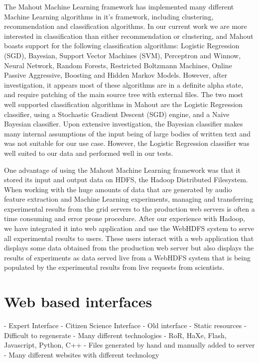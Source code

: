\documentclass[12pt,oneside]{book}
\begin{document}
The Mahout Machine Learning framework has implemented many different
Machine Learning algorithms in it's framework, including clustering,
recommendation and classification algorithms.  In our current work we
are more interested in classification than either recommendation or
clustering, and Mahout boasts support for the following classification
algorithms: Logistic Regression (SGD), Bayesian, Support Vector
Machines (SVM), Perceptron and Winnow, Neural Network, Random Forests,
Restricted Boltzmann Machines, Online Passive Aggressive, Boosting and
Hidden Markov Models.  However, after investigation, it appears most
of these algorithms are in a definite alpha state, and require
patching of the main source tree with external files.  The two most
well supported classification algorithms in Mahout are the Logistic
Regression classifier, using a Stochastic Gradient Descent (SGD)
engine, and a Naive Bayesian classifier.  Upon extensive
investigation, the Bayesian classifier makes many internal assumptions
of the input being of large bodies of written text and was not
suitable for our use case.  However, the Logistic Regression
classifier was well suited to our data and performed well in our
tests.

One advantage of using the Mahout Machine Learning framework was that
it stored its input and output data on HDFS, the Hadoop Distributed
Filesystem.  When working with the huge amounts of data that are
generated by audio feature extraction and Machine Learning
experiments, managing and transferring experimental results from the
grid servers to the production web servers is often a time consuming
and error prone procedure.  After our experience with Hadoop, we have
integrated it into web application and use the WebHDFS system to serve
all experimental results to users.  These users interact with a web
application that displays some data obtained from the production web
server but also displays the results of experiments as data served
live from a WebHDFS system that is being populated by the experimental
results from live requests from scientists.


\section{Web based interfaces}


- Expert Interface
- Citizen Science Interface
- Old interface
	- Static resources
	- Difficult to regenerate
	- Many different technologies
		- RoR, HaXe, Flash, Javascript, Python, C++
	- Files generated by hand and manually added to server
	- Many different websites with different technology
\end{document}
